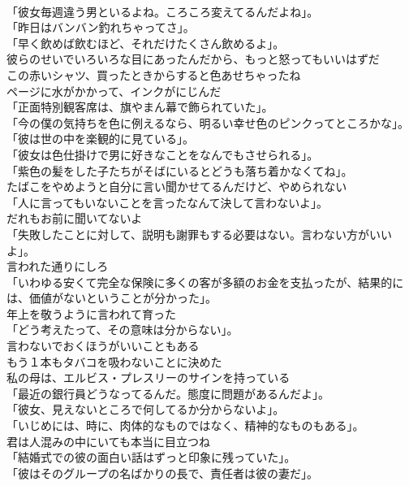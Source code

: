 \documentclass[8pt]{extreport}
\begin{document}
\begin{CJK}{UTF8}{min}
\\	「彼女毎週違う男といるよね。ころころ変えてるんだよね」。	
\\	「昨日はバンバン釣れちゃってさ」。	
\\	「早く飲めば飲むほど、それだけたくさん飲めるよ」。	
\\	彼らのせいでいろいろな目にあったんだから、もっと怒ってもいいはずだ	
\\	この赤いシャツ、買ったときからすると色あせちゃったね	
\\	ページに水がかかって、インクがにじんだ	
\\	「正面特別観客席は、旗やまん幕で飾られていた」。	
\\	「今の僕の気持ちを色に例えるなら、明るい幸せ色のピンクってところかな」。	
\\	「彼は世の中を楽観的に見ている」。	
\\	「彼女は色仕掛けで男に好きなことをなんでもさせられる」。	
\\	「紫色の髪をした子たちがそばにいるとどうも落ち着かなくてね」。	
\\	たばこをやめようと自分に言い聞かせてるんだけど、やめられない	
\\	「人に言ってもいないことを言ったなんて決して言わないよ」。	
\\	だれもお前に聞いてないよ	
\\	「失敗したことに対して、説明も謝罪もする必要はない。言わない方がいいよ」。	
\\	言われた通りにしろ	
\\	「いわゆる安くて完全な保険に多くの客が多額のお金を支払ったが、結果的には、価値がないということが分かった」。	
\\	年上を敬うように言われて育った	
\\	「どう考えたって、その意味は分からない」。	
\\	言わないでおくほうがいいこともある	
\\	もう１本もタバコを吸わないことに決めた	
\\	私の母は、エルビス・プレスリーのサインを持っている	
\\	「最近の銀行員どうなってるんだ。態度に問題があるんだよ」。	
\\	「彼女、見えないところで何してるか分からないよ」。	
\\	「いじめには、時に、肉体的なものではなく、精神的なものもある」。	
\\	君は人混みの中にいても本当に目立つね	
\\	「結婚式での彼の面白い話はずっと印象に残っていた」。	
\\	「彼はそのグループの名ばかりの長で、責任者は彼の妻だ」。	

\end{CJK}
\end{document}
